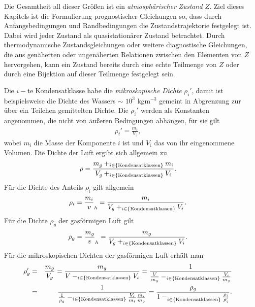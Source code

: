 \documentclass{book}
\let\sum\relax
\DeclareMathOperator*{\sum}{\raisebox{-3.5pt}{\scalebox{2}{\rotatebox{1}{{\bask Σ}}}}}
\begin{document}
%
Die Gesamtheit all dieser Größen ist ein \textit{atmosphärischer Zustand} $Z$. Ziel dieses Kapitels ist die Formulierung prognostischer Gleichungen so, dass durch Anfangsbedingungen und Randbedingungen die Zustandstrajektorie festgelegt ist. Dabei wird jeder Zustand als quasistationärer Zustand betrachtet. Durch thermodynamische Zustandsgleichungen oder weitere diagnostische Gleichungen, die aus genäherten oder ungenäherten Relationen zwischen den Elementen von $Z$ hervorgehen, kann ein Zustand bereits durch eine echte Teilmenge von $Z$ oder durch eine Bijektion auf dieser Teilmenge festgelegt sein.

Die $i-$te Kondensatklasse habe die \textit{mikroskopische Dichte} $\rho_i'$, damit ist beispielsweise die Dichte des Wassers $\sim$ $10^3$ kgm$^{-3}$ gemeint in Abgrenzung zur über ein Teilchen gemittelten Dichte. Die $\rho_i'$ werden als Konstanten angenommen, die nicht von äußeren Bedingungen abhängen, für sie gilt 
%
\begin{eqnarray}
\rho_i' = \frac{m_i}{V_i}, 
\end{eqnarray}
%
wobei $m_i$ die Masse der Komponente $i$ ist und $V_i$ das von ihr eingenommene Volumen. Die Dichte der Luft ergibt sich allgemein zu
%
\begin{eqnarray}
\rho = \frac{m_g + \sum_{i \in \left\lbrace\text{Kondensatklassen}\right\rbrace}m_i}{V_g + \sum_{i \in \left\lbrace\text{Kondensatklassen}\right\rbrace} V_i}.
\end{eqnarray}
%
Für die Dichte des Anteils $\rho_i$ gilt allgemein
%
\begin{eqnarray}
\rho_i = \frac{m_i}{v}_h = \frac{m_i}{V_g + \sum_{i \in \left\lbrace\text{Kondensatklassen}\right\rbrace}V_i}.
\end{eqnarray}
%
Für die Dichte $\rho_g$ der gasförmigen Luft gilt
%
\begin{eqnarray}
\rho_g = \frac{m_g}{v}_h = \frac{m_g}{V_g + \sum_{i \in \left\lbrace\text{Kondensatklassen}\right\rbrace}V_i}.
\end{eqnarray}
%
Für die mikroskopischen Dichten der gasförmigen Luft erhält man
%
\begin{eqnarray}
\rho_g' & = & \frac{m_g}{V_g} = \frac{m_g}{V - \sum_{i \in \left\lbrace\text{Kondensatklassen}\right\rbrace}V_i} = \frac{1}{\frac{V}{m_g} - \sum_{i \in \left\lbrace\text{Kondensatklassen}\right\rbrace}\frac{V_i}{m_g}}\nonumber\\
& = & \frac{1}{\frac{1}{\rho_g} - \sum_{i \in \left\lbrace\text{Kondensatklassen}\right\rbrace}\frac{V_i}{m_i}\frac{m_i}{m_g}} = \frac{\rho_g}{1 - \sum_{i \in \left\lbrace\text{Kondensatklassen}\right\rbrace}^{}\frac{\rho_i}{\rho_i'}}.
\end{eqnarray}
\end{document}
